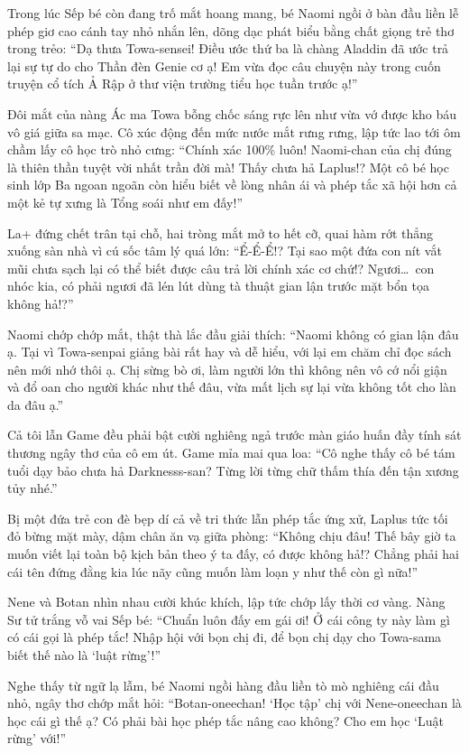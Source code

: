 \documentclass[../main.tex]{subfiles}
\begin{document}
Trong lúc Sếp bé còn đang trố mắt hoang mang, bé Naomi ngồi ở bàn đầu liền lễ phép giơ cao cánh tay nhỏ nhắn lên, dõng dạc phát biểu bằng chất giọng trẻ thơ trong trẻo: ``Dạ thưa Towa-sensei! Điều ước thứ ba là chàng Aladdin đã ước trả lại sự tự do cho Thần đèn Genie cơ ạ! Em vừa đọc câu chuyện này trong cuốn truyện cổ tích Ả Rập ở thư viện trường tiểu học tuần trước ạ!''

Đôi mắt của nàng Ác ma Towa bỗng chốc sáng rực lên như vừa vớ được kho báu vô giá giữa sa mạc. Cô xúc động đến mức nước mắt rưng rưng, lập tức lao tới ôm chầm lấy cô học trò nhỏ cưng: ``Chính xác 100\% luôn! Naomi-chan của chị đúng là thiên thần tuyệt vời nhất trần đời mà! Thấy chưa hả Laplus!? Một cô bé học sinh lớp Ba ngoan ngoãn còn hiểu biết về lòng nhân ái và phép tắc xã hội hơn cả một kẻ tự xưng là Tổng soái như em đấy!''

La+ đứng chết trân tại chỗ, hai tròng mắt mở to hết cỡ, quai hàm rớt thẳng xuống sàn nhà vì cú sốc tâm lý quá lớn: ``Ể-Ể-Ể!? Tại sao một đứa con nít vắt mũi chưa sạch lại có thể biết được câu trả lời chính xác cơ chứ!? Ngươi\dots\ con nhóc kia, có phải ngươi đã lén lút dùng tà thuật gian lận trước mặt bổn tọa không hả!?''

Naomi chớp chớp mắt, thật thà lắc đầu giải thích: ``Naomi không có gian lận đâu ạ. Tại vì Towa-senpai giảng bài rất hay và dễ hiểu, với lại em chăm chỉ đọc sách nên mới nhớ thôi ạ. Chị sừng bò ơi, làm người lớn thì không nên vô cớ nổi giận và đổ oan cho người khác như thế đâu, vừa mất lịch sự lại vừa không tốt cho làn da đâu ạ.''

Cả tôi lẫn Game đều phải bật cười nghiêng ngả trước màn giáo huấn đầy tính sát thương ngây thơ của cô em út. Game mỉa mai qua loa: ``Cô nghe thấy cô bé tám tuổi dạy bảo chưa hả Darknesss-san? Từng lời từng chữ thấm thía đến tận xương tủy nhé.''

Bị một đứa trẻ con đè bẹp dí cả về tri thức lẫn phép tắc ứng xử, Laplus tức tối đỏ bừng mặt mày, dậm chân ăn vạ giữa phòng: ``Không chịu đâu! Thế bây giờ ta muốn viết lại toàn bộ kịch bản theo ý ta đấy, có được không hả!? Chẳng phải hai cái tên đứng đằng kia lúc nãy cũng muốn làm loạn y như thế còn gì nữa!''

Nene và Botan nhìn nhau cười khúc khích, lập tức chớp lấy thời cơ vàng. Nàng Sư tử trắng vỗ vai Sếp bé: ``Chuẩn luôn đấy em gái ơi! Ở cái công ty này làm gì có cái gọi là phép tắc! Nhập hội với bọn chị đi, để bọn chị dạy cho Towa-sama biết thế nào là `luật rừng'!''

Nghe thấy từ ngữ lạ lẫm, bé Naomi ngồi hàng đầu liền tò mò nghiêng cái đầu nhỏ, ngây thơ chớp mắt hỏi: ``Botan-oneechan! `Học tập' chị với Nene-oneechan là học cái gì thế ạ? Có phải bài học phép tắc nâng cao không? Cho em học `Luật rừng' với!''
\end{document}
